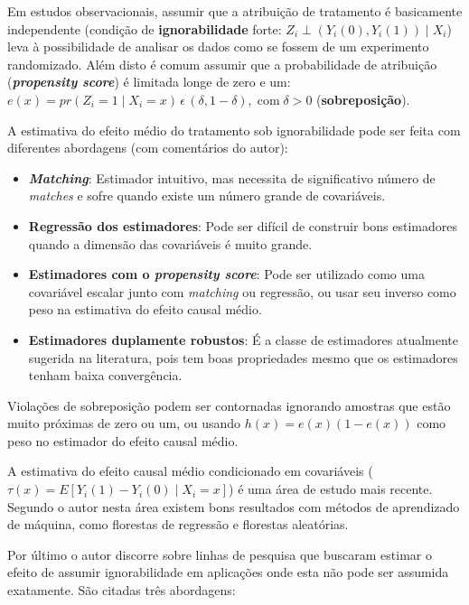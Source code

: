 \documentclass[final,5p]{elsarticle}
\numberwithin{equation}{section}
\begin{document}
    Em estudos observacionais, assumir que a atribuição de tratamento é basicamente independente (condição de \textbf{ignorabilidade} forte: $Z_i \perp (Y_i(0),Y_i(1)) \mid X_i$) leva à possibilidade de analisar os dados como se fossem de um experimento randomizado. Além disto é comum assumir que a probabilidade de atribuição (\textbf{\textit{propensity score}}) é limitada longe de zero e um: $e(x) = pr(Z_i=1 \mid X_i=x)\, \epsilon \, (\delta, 1 - \delta), \; \text{com} \; \delta > 0$ (\textbf{sobreposição}).

    A estimativa do efeito médio do tratamento sob ignorabilidade pode ser feita com diferentes abordagens (com comentários do autor):
    \begin{itemize}
        \item \textbf{\textit{Matching}}: Estimador intuitivo, mas necessita de significativo número de \textit{matches} e sofre quando existe um número grande de covariáveis.
        \item \textbf{Regressão dos estimadores}: Pode ser difícil de construir bons estimadores quando a dimensão das covariáveis é muito grande.
        \item \textbf{Estimadores com o \textit{propensity score}}: Pode ser utilizado como uma covariável escalar junto com \textit{matching} ou regressão, ou usar seu inverso como peso na estimativa do efeito causal médio.
        \item \textbf{Estimadores duplamente robustos}: É a classe de estimadores atualmente sugerida na literatura, pois tem boas propriedades mesmo que os estimadores tenham baixa convergência.
    \end{itemize}

    Violações de sobreposição podem ser contornadas ignorando amostras que estão muito próximas de zero ou um, ou usando $h(x) = e(x)(1-e(x))$ como peso no estimador do efeito causal médio.

    A estimativa do efeito causal médio condicionado em covariáveis ($\tau(x) = E[Y_i(1)-Y_i(0) \mid X_i=x]$) é uma área de estudo mais recente. Segundo o autor nesta área existem bons resultados com métodos de aprendizado de máquina, como florestas de regressão e florestas aleatórias.

    Por último o autor discorre sobre linhas de pesquisa que buscaram estimar o efeito de assumir ignorabilidade em aplicações onde esta não pode ser assumida exatamente. São citadas três abordagens:
\end{document}
